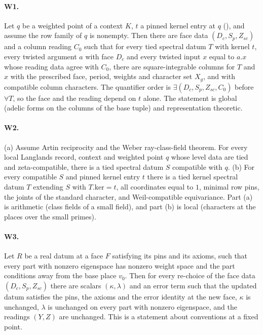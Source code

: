 \documentclass[11pt]{article}
\theoremstyle{remark}
\begin{document}
\paragraph{W1.} Let $q$ be a weighted point of a context $K$, $t$ a pinned kernel entry at $q$ (), and assume the row family of $q$ is nonempty. Then there are face data $(D_c,S_p,Z_{sc})$ and a column reading $C_0$ such that for every tied spectral datum $T$ with kernel $t$, every twisted argument $a$ with face $D_c$ and every twisted input $x$ equal to $a.x$ whose reading data agree with $C_0$, there are square-integrable columns for $T$ and $x$ with the prescribed face, period, weights and character set $X_g$, and with compatible column characters. The quantifier order is $\exists(D_c,S_p,Z_{sc},C_0)$ before $\forall T$, so the face and the reading depend on $t$ alone. The statement is global (adelic forms on the columns of the base tuple) and representation theoretic.

\paragraph{W2.} (a) Assume Artin reciprocity and the Weber ray-class-field theorem. For every local Langlands record, context and weighted point $q$ whose level data are tied and zeta-compatible, there is a tied spectral datum $S$ compatible with $q$. (b) For every compatible $S$ and pinned kernel entry $t$ there is a tied kernel spectral datum $T$ extending $S$ with $T.\mathrm{ker}=t$, all coordinates equal to $1$, minimal row pins, the joints of the standard character, and Weil-compatible equivariance. Part (a) is arithmetic (class fields of a small field), and part (b) is local (characters at the places over the small primes).

\paragraph{W3.} Let $R$ be a real datum at a face $F$ satisfying its pins and its axioms, such that every part with nonzero eigenspace has nonzero weight space and the part conditions away from the base place $v_0$. Then for every re-choice of the face data $(D_c,S_p,Z_{sc})$ there are scalars $(\kappa,\lambda)$ and an error term such that the updated datum satisfies the pins, the axioms and the error identity at the new face, $\kappa$ is unchanged, $\lambda$ is unchanged on every part with nonzero eigenspace, and the readings $(Y,Z)$ are unchanged. This is a statement about conventions at a fixed point.
\end{document}
